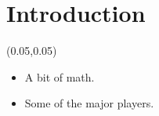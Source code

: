 \documentclass[aspectratio=169]{beamer} %
\begin{document}
\section{Introduction}

\begin{frame}{}
	\setlength{\TPHorizModule}{\textwidth}
	\setlength{\TPVertModule}{\textwidth}
	\begin{textblock}{0.74}(0.05,0.05)
		\bfseries\large{}
	\end{textblock}
	\begin{itemize}
		\item A bit of math.
		\item Some of the major players.
	\end{itemize}
\end{frame}
\end{document}
